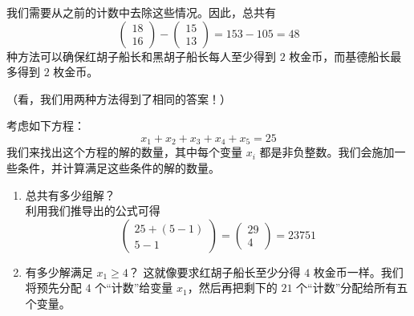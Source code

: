 \begin{example}
\begin{enumerate}[label=(\arabic*)]
\begin{enumerate}[label=(\roman*)]
                        我们需要从之前的计数中去除这些情况。因此，总共有
                        \[\begin{pmatrix}18\\16\end{pmatrix}-\begin{pmatrix}15\\13\end{pmatrix}=153 - 105 = 48\]
                        种方法可以确保红胡子船长和黑胡子船长每人至少得到 $2$ 枚金币，而基德船长最多得到 $2$ 枚金币。
              \end{enumerate}
              （看，我们用两种方法得到了相同的答案！）
    \end{enumerate}
\end{example}

\begin{example}
    考虑如下方程：
    \[x_1 + x_2 + x_3 + x_4 + x_5 = 25\]
    我们来找出这个方程的解的数量，其中每个变量 $x_i$ 都是非负整数。我们会施加一些条件，并计算满足这些条件的解的数量。
    \begin{enumerate}[label=(\arabic*)]
        \item 总共有多少组解？\\
              利用我们推导出的公式可得
              \[\begin{pmatrix}25+(5-1)\\5-1\end{pmatrix}=\begin{pmatrix}29\\4\end{pmatrix}=23751\]
        \item 有多少解满足 $x_1 \ge 4$？
              这就像要求红胡子船长至少分得 $4$ 枚金币一样。我们将预先分配 $4$ 个``计数''给变量 $x_1$，然后再把剩下的 $21$ 个``计数''分配给所有五个变量。


\end{enumerate}
\end{example}
